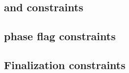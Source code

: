 \subsection{\ct{} and \maxCt{} constraints}                                                              \label{rlp auth: generalities: ct and ct_max}                              
\subsection{\utils{} phase flag constraints}                                                             \label{rlp auth: generalities: utils phase flag constraints}               
\subsection{Finalization constraints}                                                                    \label{rlp auth: generalities: finalization}                               
